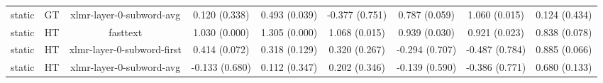 \begin{sidewaystable}[htb]
\begin{tabular}{@{}ccccccccc@{}}
        static & GT & xlmr-layer-0-subword-avg & 0.120 (0.338) & 0.493 (0.039) & -0.377 (0.751) & 0.787 (0.059) & 1.060 (0.015) & 0.124 (0.434) \\
        static & HT & fasttext & 1.030 (0.000) & 1.305 (0.000) & 1.068 (0.015) & 0.939 (0.030) & 0.921 (0.023) & 0.838 (0.078) \\
        static & HT & xlmr-layer-0-subword-first & 0.414 (0.072) & 0.318 (0.129) & 0.320 (0.267) & -0.294 (0.707) & -0.487 (0.784) & 0.885 (0.066) \\
        static & HT & xlmr-layer-0-subword-avg & -0.133 (0.680) & 0.112 (0.347) & 0.202 (0.346) & -0.139 (0.590) & -0.386 (0.771) & 0.680 (0.133) \\
        \bottomrule
    \end{tabular}
\end{sidewaystable}